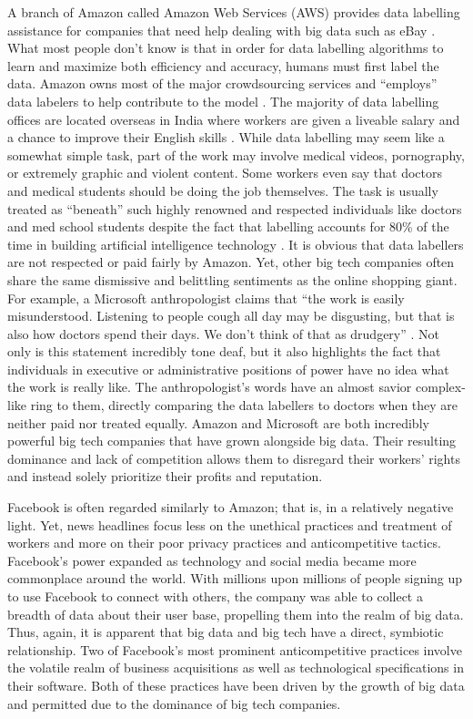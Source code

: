 \documentclass[twoside]{article}
\begin{document}
A branch of Amazon called Amazon Web Services (AWS) provides data labelling assistance for companies that need help dealing with big data such as eBay \cite{aws}. What most people don’t know is that in order for data labelling algorithms to learn and maximize both efficiency and accuracy, humans must first label the data. Amazon owns most of the major crowdsourcing services and “employs” data labelers to help contribute to the model \cite{ai}. The majority of data labelling offices are located overseas in India where workers are given a liveable salary and a chance to improve their English skills \cite{ai}. While data labelling may seem like a somewhat simple task, part of the work may involve medical videos, pornography, or extremely graphic and violent content. Some workers even say that doctors and medical students should be doing the job themselves. The task is usually treated as “beneath” such highly renowned and respected individuals like doctors and med school students despite the fact that labelling accounts for 80\% of the time in building artificial intelligence technology \cite{ai}. It is obvious that data labellers are not respected or paid fairly by Amazon. Yet, other big tech companies often share the same dismissive and belittling sentiments as the online shopping giant. For example, a Microsoft anthropologist claims that “the work is easily misunderstood. Listening to people cough all day may be disgusting, but that is also how doctors spend their days. We don’t think of that as drudgery” \cite{ai}. Not only is this statement incredibly tone deaf, but it also highlights the fact that individuals in executive or administrative positions of power have no idea what the work is really like. The anthropologist’s words have an almost savior complex-like ring to them, directly comparing the data labellers to doctors when they are neither paid nor treated equally. Amazon and Microsoft are both incredibly powerful big tech companies that have grown alongside big data. Their resulting dominance and lack of competition allows them to disregard their workers’ rights and instead solely prioritize their profits and reputation.

Facebook is often regarded similarly to Amazon; that is, in a relatively negative light. Yet, news headlines focus less on the unethical practices and treatment of workers and more on their poor privacy practices and anticompetitive tactics. Facebook’s power expanded as technology and social media became more commonplace around the world. With millions upon millions of people signing up to use Facebook to connect with others, the company was able to collect a breadth of data about their user base, propelling them into the realm of big data. Thus, again, it is apparent that big data and big tech have a direct, symbiotic relationship. Two of Facebook’s most prominent anticompetitive practices involve the volatile realm of business acquisitions as well as technological specifications in their software. Both of these practices have been driven by the growth of big data and permitted due to the dominance of big tech companies.
\end{document}

